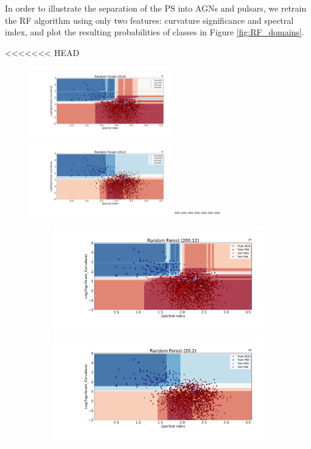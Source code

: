 In order to illustrate the separation of the PS into AGNs and pulsars, we retrain the RF algorithm using only two features: curvature significance and spectral index, and plot the resulting probabilities of classes in Figure \ref{fig:RF_domains}.

<<<<<<< HEAD
\begin{figure}[h]
\centering
\hspace*{-2.5cm}
\includegraphics[width=0.55\textwidth,left]{plots/classification_domains/rf_20_8.pdf}
\hspace*{-2.5cm}
\includegraphics[width=0.55\textwidth,left]{plots/classification_domains/rf_20_2.pdf}
=======
\begin{figure}[h]
\includegraphics[width=\twocolumnwidth\textwidth]{plots/classification_domains/rf_200_12.pdf}\\
\includegraphics[width=\twocolumnwidth\textwidth]{plots/classification_domains/rf_20_2.pdf}

\end{figure}
\end{figure}
